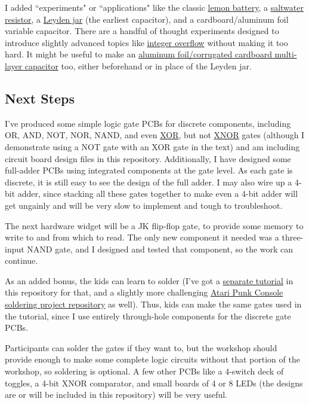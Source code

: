 I added ``experiments" or ``applications" like the classic {\color{webblue}\href{https://en.wikipedia.org/wiki/Lemon_battery}{lemon battery}}, a {\color{webblue}\href{https://en.wikipedia.org/wiki/Liquid_rheostat}{saltwater resistor}}, a {\color{webblue}\href{https://en.wikipedia.org/wiki/Leyden_jar}{Leyden jar}} (the earliest capacitor), and a cardboard/aluminum foil variable capacitor. There are a handful of thought experiments designed to introduce slightly advanced topics like {\color{webblue}\href{https://en.wikipedia.org/wiki/Integer_overflow}{integer overflow}} without making it too hard. It might be useful to make an {\color{webblue}\href{http://bizarrelabs.com/crystal.htm}{aluminum foil/corrugated cardboard multi-layer capacitor}} too, either beforehand or in place of the Leyden jar.

\subsection*{Next Steps}

I've produced some simple logic gate PCBs for discrete components, including OR, AND, NOT, NOR, NAND, and even {\color{webblue}\href{https://en.wikipedia.org/wiki/XOR_gate}{XOR}}, but not {\color{webblue}\href{https://en.wikipedia.org/wiki/XNOR_gate}{XNOR}} gates (although I demonstrate using a NOT gate with an XOR gate in the text) and am including circuit board design files in this repository. Additionally, I have designed some full-adder PCBs using integrated components at the gate level. As each gate is discrete, it is still easy to see the design of the full adder. I may also wire up a 4-bit adder, since stacking all these gates together to make even a 4-bit adder will get ungainly and will be very slow to implement and tough to troubleshoot. 

The next hardware widget will be a JK flip-flop gate, to provide some memory to write to and from which to read.
The only new component it needed was a three-input NAND gate, and I designed and tested that component, so the work can continue.

As an added bonus, the kids can learn to solder (I've got a {\color{webblue}\href{https://github.com/jessehamner/TechMillForKids/tree/master/soldering}{separate tutorial}} in this repository for that, and a slightly more challenging {\color{webblue}\href{https://github.com/jessehamner/AtariPunkConsole}{Atari Punk Console soldering project repository}} as well). Thus, kids can make the same gates used in the tutorial, since I use entirely through-hole components for the discrete gate PCBs. 

Participants can solder the gates if they want to, but the workshop should provide enough to make some complete logic circuits without that portion of the workshop, so soldering is optional. A few other PCBs like a 4-switch deck of toggles, a 4-bit XNOR comparator, and small boards of 4 or 8 LEDs (the designs are or will be included in this repository) will be very useful.
